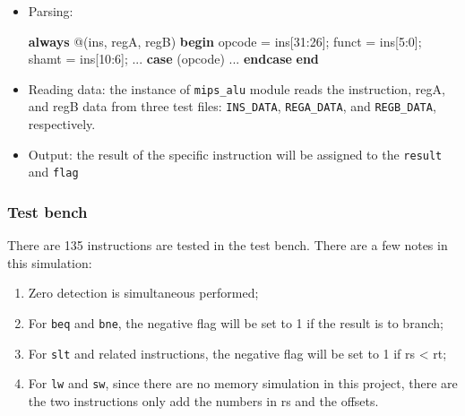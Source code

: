 \documentclass[
]{article}
\newenvironment{Shaded}{}{}
\newcommand{\DecValTok}[1]{\textcolor[rgb]{0.25,0.63,0.44}{#1}}
\newcommand{\KeywordTok}[1]{\textcolor[rgb]{0.00,0.44,0.13}{\textbf{#1}}}
\newcommand{\NormalTok}[1]{#1}
\begin{document}
\begin{itemize}
\item
  Parsing:

\begin{Shaded}
\begin{Highlighting}[]
\KeywordTok{always}\NormalTok{ @(ins, regA, regB) }\KeywordTok{begin}
\NormalTok{    opcode = ins[}\DecValTok{31}\NormalTok{:}\DecValTok{26}\NormalTok{];}
\NormalTok{    funct  = ins[}\DecValTok{5}\NormalTok{:}\DecValTok{0}\NormalTok{];}
\NormalTok{    shamt  = ins[}\DecValTok{10}\NormalTok{:}\DecValTok{6}\NormalTok{];}
\NormalTok{    ...}
    \KeywordTok{case}\NormalTok{ (opcode)}
\NormalTok{        ...}
    \KeywordTok{endcase}
\KeywordTok{end}
\end{Highlighting}
\end{Shaded}
\end{itemize}

\begin{itemize}
\item
  Reading data: the instance of \texttt{mips\_alu} module reads the
  instruction, regA, and regB data from three test files:
  \texttt{INS\_DATA}, \texttt{REGA\_DATA}, and \texttt{REGB\_DATA},
  respectively.
\item
  Output: the result of the specific instruction will be assigned to the
  \texttt{result} and \texttt{flag}
\end{itemize}

\hypertarget{header-n53}{%
\subsubsection{Test bench}\label{header-n53}}

There are 135 instructions are tested in the test bench. There are a few
notes in this simulation:

\begin{enumerate}
\def\labelenumi{\arabic{enumi}.}
\item
  Zero detection is simultaneous performed;
\item
  For \texttt{beq} and \texttt{bne}, the negative flag will be set to 1
  if the result is to branch;
\item
  For \texttt{slt} and related instructions, the negative flag will be
  set to 1 if rs \textless{} rt;
\item
  For \texttt{lw} and \texttt{sw}, since there are no memory simulation
  in this project, there are the two instructions only add the numbers
  in rs and the offsets.
\end{enumerate}
\end{document}
